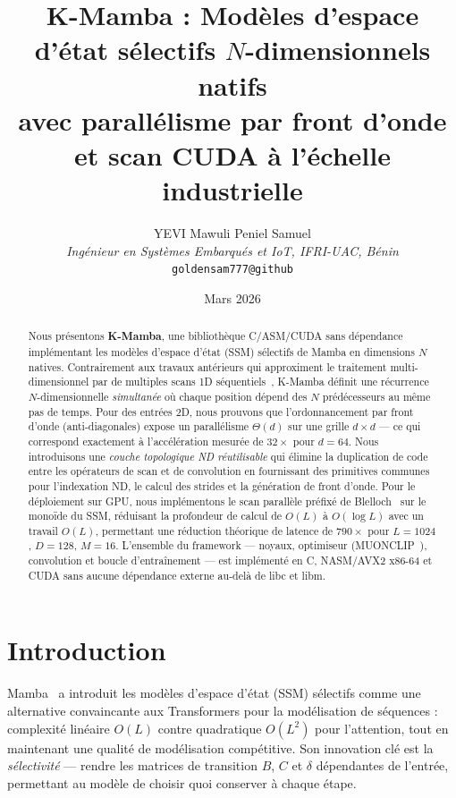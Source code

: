 \documentclass[10pt,onecolumn]{article}
\title{\textbf{K-Mamba : Modèles d'espace d'état sélectifs $N$-dimensionnels natifs\\
avec parallélisme par front d'onde et scan CUDA à l'échelle industrielle}}
\author{
  YEVI Mawuli Peniel Samuel\\
  \textit{Ingénieur en Systèmes Embarqués et IoT, IFRI-UAC, Bénin}\\
  \texttt{goldensam777@github}
}
\date{Mars 2026}
\begin{document}
\maketitle

\renewcommand{\abstractname}{Résumé}
\renewcommand{\refname}{Références}

\begin{abstract}
Nous présentons \textbf{K-Mamba}, une bibliothèque C/ASM/CUDA sans dépendance
implémentant les modèles d'espace d'état (SSM) sélectifs de Mamba en dimensions
$N$ natives.
Contrairement aux travaux antérieurs qui approximent le traitement
multi-dimensionnel par de multiples scans 1D séquentiels~\cite{vmamba,mamband},
K-Mamba définit une récurrence $N$-dimensionnelle \emph{simultanée} où chaque
position dépend des $N$ prédécesseurs au même pas de temps.
Pour des entrées 2D, nous prouvons que l'ordonnancement par front d'onde
(anti-diagonales) expose un parallélisme $\Theta(d)$ sur une grille $d \times d$ —
ce qui correspond exactement à l'accélération mesurée de $32\times$ pour $d = 64$.
Nous introduisons une \emph{couche topologique ND réutilisable} qui élimine la
duplication de code entre les opérateurs de scan et de convolution en fournissant
des primitives communes pour l'indexation ND, le calcul des strides et la
génération de front d'onde.
Pour le déploiement sur GPU, nous implémentons le scan parallèle préfixé de
Blelloch~\cite{blelloch1990} sur le monoïde du SSM, réduisant la profondeur de
calcul de $O(L)$ à $O(\log L)$ avec un travail $O(L)$, permettant une réduction
théorique de latence de $790\times$ pour $L = 1024$, $D = 128$, $M = 16$.
L'ensemble du framework — noyaux, optimiseur (MUONCLIP~\cite{muon2025}),
convolution et boucle d'entraînement — est implémenté en C, NASM/AVX2 x86-64
et CUDA sans aucune dépendance externe au‑delà de libc et libm.
\end{abstract}

\section{Introduction}

Mamba~\cite{mamba2023} a introduit les modèles d'espace d'état (SSM) sélectifs
comme une alternative convaincante aux Transformers pour la modélisation de
séquences : complexité linéaire $O(L)$ contre quadratique $O(L^2)$ pour
l'attention, tout en maintenant une qualité de modélisation compétitive.
Son innovation clé est la \emph{sélectivité} — rendre les matrices de transition
$B$, $C$ et $\delta$ dépendantes de l'entrée, permettant au modèle de choisir
quoi conserver à chaque étape.
\end{document}
